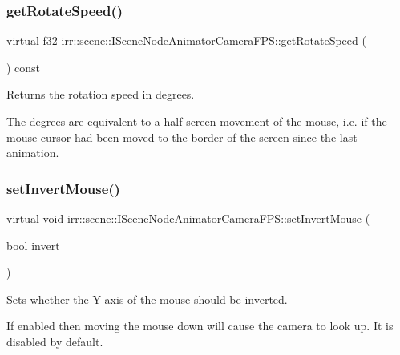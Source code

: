 \subsubsection{\texorpdfstring{get\+Rotate\+Speed()}{getRotateSpeed()}\hspace{0.1cm}{\footnotesize\ttfamily [2/2]}}
{\footnotesize\ttfamily virtual \hyperlink{namespaceirr_a0277be98d67dc26ff93b1a6a1d086b07}{f32} irr\+::scene\+::\+I\+Scene\+Node\+Animator\+Camera\+F\+P\+S\+::get\+Rotate\+Speed (\begin{DoxyParamCaption}{ }\end{DoxyParamCaption}) const\hspace{0.3cm}{\ttfamily [pure virtual]}}



Returns the rotation speed in degrees. 

The degrees are equivalent to a half screen movement of the mouse, i.\+e. if the mouse cursor had been moved to the border of the screen since the last animation. \mbox{\label{classirr_1_1scene_1_1ISceneNodeAnimatorCameraFPS_abe634d0c7b03cc6f5adb9df3f04bacd5}} 
\subsubsection{\texorpdfstring{set\+Invert\+Mouse()}{setInvertMouse()}\hspace{0.1cm}{\footnotesize\ttfamily [1/2]}}
{\footnotesize\ttfamily virtual void irr\+::scene\+::\+I\+Scene\+Node\+Animator\+Camera\+F\+P\+S\+::set\+Invert\+Mouse (\begin{DoxyParamCaption}\item[{bool}]{invert }\end{DoxyParamCaption})\hspace{0.3cm}{\ttfamily [pure virtual]}}



Sets whether the Y axis of the mouse should be inverted. 

If enabled then moving the mouse down will cause the camera to look up. It is disabled by default. \mbox{\label{classirr_1_1scene_1_1ISceneNodeAnimatorCameraFPS_abe634d0c7b03cc6f5adb9df3f04bacd5}} 
